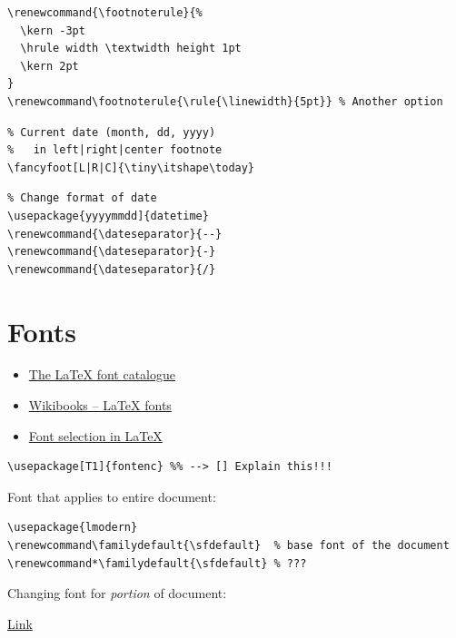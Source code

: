 \documentclass{article}
\begin{document}
\begin{lstlisting}
\renewcommand{\footnoterule}{%
  \kern -3pt
  \hrule width \textwidth height 1pt
  \kern 2pt
}
\renewcommand\footnoterule{\rule{\linewidth}{5pt}} % Another option
\end{lstlisting}

\begin{minipage}{0.5\textwidth}
\begin{lstlisting}
% Current date (month, dd, yyyy)
%   in left|right|center footnote
\fancyfoot[L|R|C]{\tiny\itshape\today}
\end{lstlisting}
\end{minipage}%
\begin{minipage}{0.5\textwidth}
\begin{lstlisting}
% Change format of date
\usepackage{yyyymmdd]{datetime}
\renewcommand{\dateseparator}{--}
\renewcommand{\dateseparator}{-}
\renewcommand{\dateseparator}{/}
\end{lstlisting}
\end{minipage}

\newpage
\section{Fonts}
\begin{itemize}
    \item \href{https://tug.org/FontCatalogue/sansseriffonts.html}{
            The \LaTeX{} font catalogue}
    \item \href{https://en.wikibooks.org/wiki/LaTeX/Fonts}{
            Wikibooks -- \LaTeX{} fonts}
    \item \href{https://www.tug.org/pracjourn/2006-1/schmidt/schmidt.pdf}{
            Font selection in \LaTeX{}}
\end{itemize}

\begin{lstlisting}
\usepackage[T1]{fontenc} %% --> [] Explain this!!!
\end{lstlisting}

Font that applies to entire document:

\begin{lstlisting}
\usepackage{lmodern}
\renewcommand\familydefault{\sfdefault}  % base font of the document
\renewcommand*\familydefault{\sfdefault} % ???
\end{lstlisting}


Changing font for \textit{portion} of document:

\href{https://tex.stackexchange.com/questions/25249/how-do-i-use-a-particular-font-for-a-small-section-of-text-in-my-document}{
    Link}
\end{document}
